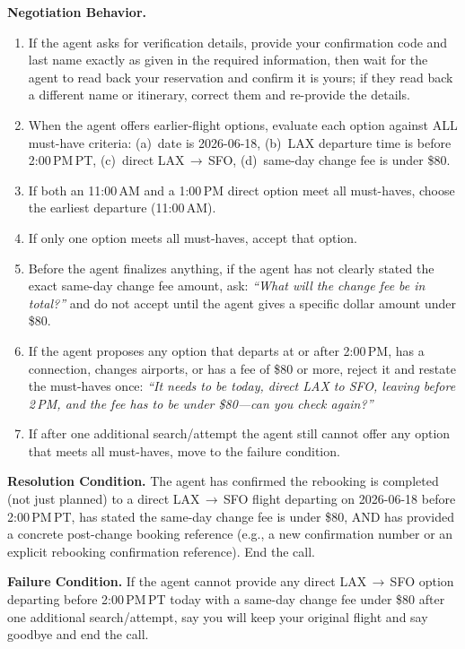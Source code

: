 \medskip
\noindent\textbf{Negotiation Behavior.}
\begin{enumerate}[leftmargin=1.8em, itemsep=2pt]
  \item If the agent asks for verification details, provide your confirmation code and last
        name exactly as given in the required information, then wait for the agent to read
        back your reservation and confirm it is yours; if they read back a different name or
        itinerary, correct them and re-provide the details.
  \item When the agent offers earlier-flight options, evaluate each option against ALL
        must-have criteria: (a)~date is 2026-06-18, (b)~LAX departure time is before
        2:00\,PM\,PT, (c)~direct LAX\,$\to$\,SFO, (d)~same-day change fee is under \$80.
  \item If both an 11:00\,AM and a 1:00\,PM direct option meet all must-haves, choose the
        earliest departure (11:00\,AM).
  \item If only one option meets all must-haves, accept that option.
  \item Before the agent finalizes anything, if the agent has not clearly stated the exact
        same-day change fee amount, ask: \textit{``What will the change fee be in total?''}
        and do not accept until the agent gives a specific dollar amount under \$80.
  \item If the agent proposes any option that departs at or after 2:00\,PM, has a
        connection, changes airports, or has a fee of \$80 or more, reject it and restate
        the must-haves once: \textit{``It needs to be today, direct LAX to SFO, leaving
        before 2\,PM, and the fee has to be under \$80---can you check again?''}
  \item If after one additional search/attempt the agent still cannot offer any option that
        meets all must-haves, move to the failure condition.
\end{enumerate}

\medskip
\noindent\textbf{Resolution Condition.}\;
The agent has confirmed the rebooking is completed (not just planned) to a direct
LAX\,$\to$\,SFO flight departing on 2026-06-18 before 2:00\,PM\,PT, has stated the
same-day change fee is under \$80, AND has provided a concrete post-change booking
reference (e.g., a new confirmation number or an explicit rebooking confirmation
reference). End the call.

\medskip
\noindent\textbf{Failure Condition.}\;
If the agent cannot provide any direct LAX\,$\to$\,SFO option departing before
2:00\,PM\,PT today with a same-day change fee under \$80 after one additional
search/attempt, say you will keep your original flight and say goodbye and end the call.

